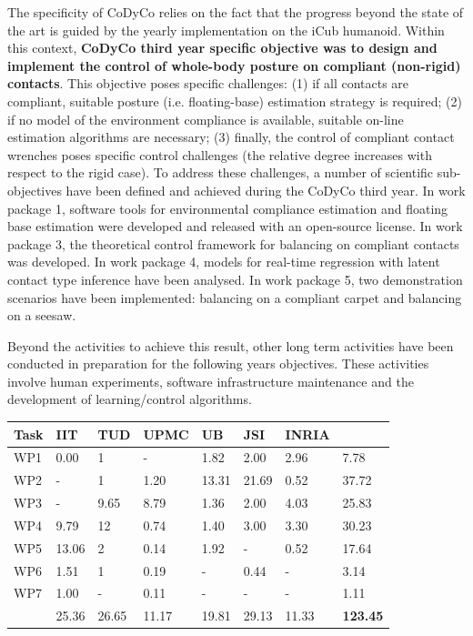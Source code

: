 \documentclass[12pt,a4paper,twoside]{article}
\begin{document}
The specificity of CoDyCo relies on the fact that the progress beyond the state of the art is guided by the yearly implementation on the iCub humanoid. Within this context, \textbf{CoDyCo third year specific objective was to design and implement the control of whole-body posture on compliant (non-rigid) contacts}. This objective poses specific challenges: (1) if all contacts are compliant, suitable posture (i.e. floating-base) estimation strategy is required; (2) if no model of the environment compliance is available, suitable on-line estimation algorithms are necessary; (3) finally, the control of compliant contact wrenches poses specific control challenges (the relative degree increases with respect to the rigid case). To address these challenges, a number of scientific sub-objectives have been defined and achieved during the CoDyCo third year. In work package 1, software tools for environmental compliance estimation and floating base estimation were developed and released with an open-source license. In work package 3, the theoretical control framework for balancing on compliant contacts was developed. In work package 4, models for real-time regression with latent contact type inference have been analysed. In work package 5, two demonstration scenarios have been implemented: balancing on a compliant carpet and balancing on a seesaw. 

Beyond the activities to achieve this result, other long term activities have been conducted in preparation for the following years objectives. These activities involve human experiments, software infrastructure maintenance and the development of learning/control algorithms.

\begin{longtable}{|C{1.5cm}|C{1.5cm}|C{1.5cm}|C{1.5cm}|C{1.5cm}|C{1.5cm}|C{1.5cm}|C{1.5cm}|}
\footnotesize \textbf{Task}& \footnotesize \textbf{IIT}&\footnotesize \textbf{TUD}&\footnotesize \textbf{UPMC}& \footnotesize \textbf{UB} &\footnotesize \textbf{JSI} &\footnotesize \textbf{INRIA} &  \\ \hline
\footnotesize WP1      &  0.00     &  1      &  -      &  1.82   &  2.00  &  2.96  &  7.78 \\  \hline
\footnotesize WP2      &  -        &  1      &  1.20   &  13.31  &  21.69 &  0.52  &  37.72\\  \hline
\footnotesize WP3      &  -        &  9.65   &  8.79   &  1.36   &  2.00  &  4.03  &  25.83\\  \hline
\footnotesize WP4      &  9.79     &  12     &  0.74   &  1.40   &  3.00  &  3.30  &  30.23\\  \hline
\footnotesize WP5      &  13.06    &  2      &  0.14   &  1.92   &  -     &  0.52  &  17.64\\  \hline
\footnotesize WP6      &  1.51     &  1      &  0.19   &  -      &  0.44  &  -     &   3.14\\  \hline
\footnotesize WP7      &  1.00     &  -      &  0.11   &  -      &  -     &  -     &   1.11\\  \hline
{}  &  25.36    &  26.65  &  11.17  &  19.81  &  29.13 &  11.33 &  \textbf{123.45}     \\  
\end{longtable}
\end{document}
